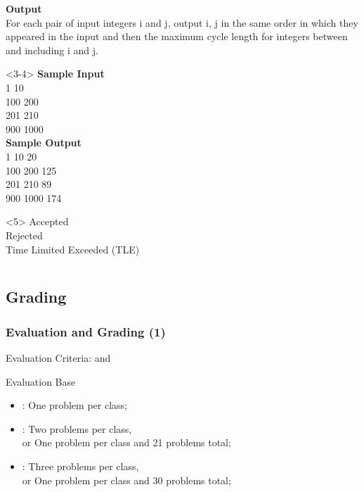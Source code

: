 \documentclass{beamer}
\begin{document}
\begin{frame}
\begin{columns}[c]
\begin{block}{}
\begin{onlyenv}
{        {\bf Output}\\
        For each pair of input integers i and j, output i, j in the
        same order in which they appeared in the input and then the
        maximum cycle length for integers between and including i and
        j.}
      \end{onlyenv}
      \begin{onlyenv}<3-4>
        {\small
        {\bf Sample Input}\\
        1 10\\
        100 200\\
        201 210\\
        900 1000\\
        
        {\bf Sample Output}\\
        1 10 20\\
        100 200 125\\
        201 210 89\\
        900 1000 174\\}
      \end{onlyenv}
      \begin{onlyenv}<5>
        Accepted\\
        Rejected\\
        Time Limited Exceeded (TLE)\\
      \end{onlyenv}
    \end{block}
  \end{columns}
\end{frame}

\subsection{Grading}

\begin{frame}
  \frametitle{Evaluation and Grading (1)}

  Evaluation Criteria:  and 
  
  \begin{block}{Evaluation Base}
  \begin{itemize}
  \item {}: One problem per class;
  \item {}: Two problems per class,\\
    or One problem per class and 21 problems total;
  \item {}: Three problems per class,\\
    or One problem per class and 30 problems total;
  \end{itemize}
  \end{block}
\end{frame}
\end{document}
